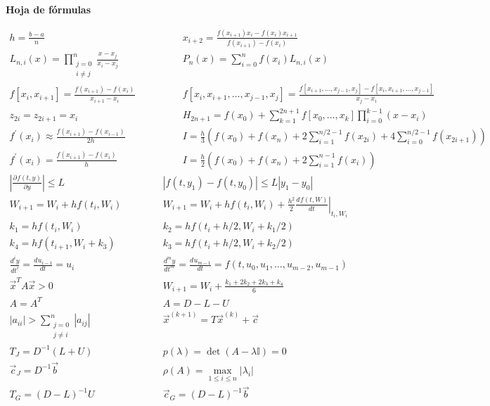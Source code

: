 \documentclass[12pt]{article}
\newcommand{\I}{\ensuremath{\mathbb{I}}}
\newcommand{\diff}[3]{\frac{d^{#3}#1}{d#2^{#3}}}
\newcommand{\pdiff}[3]{\frac{\partial^{#3}#1}{\partial#2^{#3}}}
\newcommand{\abs}[1]{\left| #1 \right|}
\begin{document}
\clearpage
\begin{center}
\textbf{Hoja de fórmulas}
\end{center}
{\large
\[
\begin{array}{cc}
h = \frac{b - a}{n} \qquad & \qquad
x_{i+2} = \frac{f(x_{i+1}){x_i}-f(x_{i}){x_{i+1}}}{f(x_{i+1}) - f(x_i)} \\
L_{n, i}(x) = \prod\limits_{\substack{j=0\\ i \neq j}}^n \frac{x - x_j}{x_i - x_j} \qquad & \qquad
P_n(x) = \sum\limits_{i = 0}^n f(x_i)L_{n,i}(x) \\
f\left[x_i, x_{i+1}\right] = \frac{f(x_{i+1})-f(x_i)}{x_{i+1}-x_i} \qquad & \qquad
f\left[ x_i, x_{i+1}, \ldots, x_{j-1}, x_j\right] = \frac{f\left[x_{i+1}, \ldots, x_{j-1}, x_j\right] - f\left[ x_i, x_{i+1}, \ldots, x_{j-1} \right]}{x_j - x_i} \\
z_{2i} = z_{2i+1} = x_i \qquad & \qquad
H_{2n+1} = f(x_0) + \sum\limits_{k=1}^{2n+1} f\left[x_0, \ldots, x_k\right] \prod\limits_{i = 0}^{k-1}(x-x_i)  \\
f^\prime(x_i) \approx \frac{f(x_{i+1}) - f(x_{i-1})}{2h} \qquad & \qquad
I = \frac{h}{3}\left( f(x_0) + f(x_n) + 2\sum\limits_{i=1}^{n/2-1}f(x_{2i}) + 4\sum\limits_{i=0}^{n/2-1}f(x_{2i+1}) \right) \\
f^\prime(x_i) = \frac{f(x_{i+1})-f(x_i)}{h} \qquad & \qquad
I = \frac{h}{2}\left( f(x_0) + f(x_n) + 2\sum\limits_{i = 1}^{n-1}f(x_i)\right) \\
\abs{\pdiff{f(t,y)}{y}{}} \leq L & \abs{f(t, y_1) -f(t, y_0)} \leq L\abs{y_1 - y_0}\\
W_{i+1} = W_i + h f(t_i,W_i) & W_{i+1} = W_i + h f(t_i,W_i) + \frac{h^2}{2} \left.\diff{f(t,W)}{t}{} \right|_{t_i, W_i} \\
k_1  =  h f(t_i,W_i) & k_2  =  h f(t_i+h/2,W_i + k_1/2) \\
k_4  =  h f(t_{i+1},W_i + k_3) & k_3  =  h f(t_i+h/2,W_i + k_2/2)\\
\diff{y}{t}{i} = \diff{u_{i-1}}{t}{} = u_i & \diff{y}{t}{m} = \diff{u_{m-1}}{t}{} = f(t, u_0, u_1, \ldots, u_{m-2}, u_{m-1})\\
\vec{x}^T A\vec{x} > 0 & W_{i+1} = W_i + \frac{k_1+2k_2+2k_3+k_4}{6}\\
A = A^T & A = D - L - U\\
|a_{ii}| > \sum\limits_{\substack{j=0\\j\neq i}}^n |a_{ij}| & \vec{x}^{(k+1)} = T\vec{x}^{(k)} + \vec{c}\\
T_J = D^{-1}(L+U) & p(\lambda) = \det(A-\lambda \I) = 0\\
\vec{c}_J = D^{-1}\vec{b} & \rho(A) = \max\limits_{1\leq i\leq n}|\lambda_i|\\
T_G = {(D-L)}^{-1}U & \vec{c}_G = {(D-L)}^{-1}\vec{b}
\end{array}
\]
}
\end{document}
